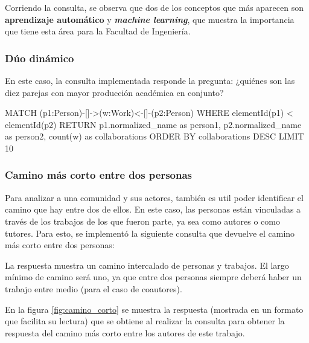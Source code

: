 \documentclass[journal]{IEEEtran}
\begin{document}
Corriendo la consulta, se observa que dos de los conceptos que más aparecen son \textbf{aprendizaje automático} y \textit{\textbf{machine learning}}, que muestra la importancia que tiene esta área para la Facultad de Ingeniería.

\subsubsection{Dúo dinámico}
En este caso, la consulta implementada responde la pregunta: ¿quiénes son las diez parejas con mayor producción académica en conjunto?

\begin{sflisting}[style=sparql,caption= Parejas con mayor cantidad de artículos publicados en conjunto,label=codigo2]
	MATCH (p1:Person)-[]->(w:Work)<-[]-(p2:Person)
	WHERE elementId(p1) < elementId(p2)
	RETURN p1.normalized_name as person1,
	p2.normalized_name as person2,
	count(w) as collaborations
	ORDER BY collaborations DESC
	LIMIT 10
\end{sflisting}

\subsubsection{Camino más corto entre dos personas}
Para analizar a una comunidad y sus actores, también es util poder identificar el camino que hay entre dos de ellos. En este caso, las personas están vinculadas a través de los trabajos de los que fueron parte, ya sea como autores o como tutores. Para esto, se implementó la siguiente consulta que devuelve el camino más corto entre dos personas:


La respuesta muestra un camino intercalado de personas y trabajos. El largo mínimo de camino será uno, ya que entre dos personas siempre deberá haber un trabajo entre medio (para el caso de coautores).

En la figura \ref{fig:camino_corto} se muestra la respuesta (mostrada en un formato que facilita su lectura) que se obtiene al realizar la consulta para obtener la respuesta del camino más corto entre los autores de este trabajo.
\end{document}
